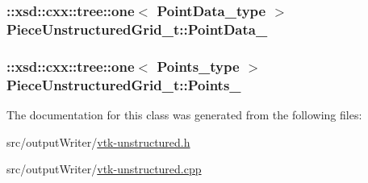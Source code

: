 \subsubsection[{\texorpdfstring{Point\+Data\+\_\+}{PointData_}}]{\setlength{\rightskip}{0pt plus 5cm}\+::xsd\+::cxx\+::tree\+::one$<$ {\bf Point\+Data\+\_\+type} $>$ Piece\+Unstructured\+Grid\+\_\+t\+::\+Point\+Data\+\_\+\hspace{0.3cm}{\ttfamily [protected]}}\hypertarget{classPieceUnstructuredGrid__t_a0c0f8305eeb054bb13a2ddcb702a40b9}{}\label{classPieceUnstructuredGrid__t_a0c0f8305eeb054bb13a2ddcb702a40b9}
\subsubsection[{\texorpdfstring{Points\+\_\+}{Points_}}]{\setlength{\rightskip}{0pt plus 5cm}\+::xsd\+::cxx\+::tree\+::one$<$ {\bf Points\+\_\+type} $>$ Piece\+Unstructured\+Grid\+\_\+t\+::\+Points\+\_\+\hspace{0.3cm}{\ttfamily [protected]}}\hypertarget{classPieceUnstructuredGrid__t_a661b6b8c1f38305c84b2864f496c37d8}{}\label{classPieceUnstructuredGrid__t_a661b6b8c1f38305c84b2864f496c37d8}


The documentation for this class was generated from the following files\+:\begin{DoxyCompactItemize}
\item 
src/output\+Writer/\hyperlink{vtk-unstructured_8h}{vtk-\/unstructured.\+h}\item 
src/output\+Writer/\hyperlink{vtk-unstructured_8cpp}{vtk-\/unstructured.\+cpp}\end{DoxyCompactItemize}
